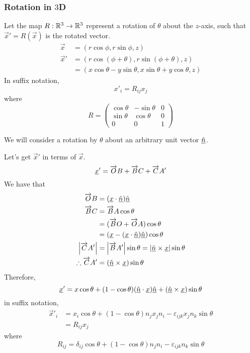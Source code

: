 \documentclass{article}
\numberwithin{equation}{section}
\begin{document}
\subsubsection{Rotation in $3$D}
Let the map $R: \mathbb{R}^3 \rightarrow \mathbb{R}^3$ represent a rotation of $\theta$ about the $z$-axis, such that $\vec x' = R(\vec x)$ is the rotated vector.
\begin{align*}
    \vec x &= (r \cos \phi, r \sin \phi, z) \\
    \vec x' &= (r \cos (\phi + \theta), r \sin (\phi + \theta), z) \\
    &= (x \cos \theta - y \sin \theta, x \sin \theta + y \cos \theta, z) 
\end{align*}
In suffix notation,
\[
    x'_i = R_{ij}x_j  
\]
where
\begin{equation}\label{eq:3-1}
    R = \begin{pmatrix}
        \cos \theta & -\sin \theta & 0 \\
        \sin \theta & \cos \theta & 0 \\
        0 & 0 & 1
    \end{pmatrix}
\end{equation}

\begin{remark}
    We will consider a rotation by $\theta$ about an arbitrary unit vector $\hat{\underline{n}}$.

    Let's get $\vec x'$ in terms of $\vec x$. 
    \[
        \underline{x}' = \overrightarrow{O}B + \overrightarrow{B}C + \overrightarrow{C}A'
    \]
    We have that
    \begin{align*}
        \overrightarrow{O}B &= (\underline{x} \cdot \hat{\underline{n}}) \hat{\underline{n}} \\
        \overrightarrow{B}C &= \overrightarrow{B}A \cos \theta \\
        &= (\overrightarrow{B}O + \overrightarrow{O}A) \cos \theta \\
        &= (\underline{x} - (\underline{x} \cdot \hat{\underline{n}})\hat{\underline{n}}) \cos \theta \\
        \left\lvert \overrightarrow{C}A'\right\rvert &= \left\lvert \overrightarrow{B}A'\right\rvert \sin \theta = \left\lvert \hat{\underline{n}} \times \underline{x}\right\rvert \sin \theta \\
        \therefore \overrightarrow{C}A' &= (\hat{\underline{n}} \times \underline{x}) \sin \theta \\
    \end{align*}
    Therefore,
    \[
        \underline{x}' = x \cos \theta + (1 - \cos \theta)(\hat{\underline{n}} \cdot \underline{x})\hat{\underline{n}} + (\hat{\underline{n}} \times \underline{x}) \sin \theta 
    \]
    in suffix notation,
    \begin{align*}
        \vec x'_i &= x_i \cos \theta + (1 - \cos \theta)n_jx_jn_i - \varepsilon_{ijk} x_jn_k \sin \theta \\
        &= R_{ij}x_j
    \end{align*}
    where
    \begin{equation}\label{eq:3-2}
        R_{ij} = \delta_{ij}\cos \theta + (1 - \cos \theta)n_jn_i - \varepsilon_{ijk} n_k \sin \theta
    \end{equation}
\end{remark}
\end{document}

